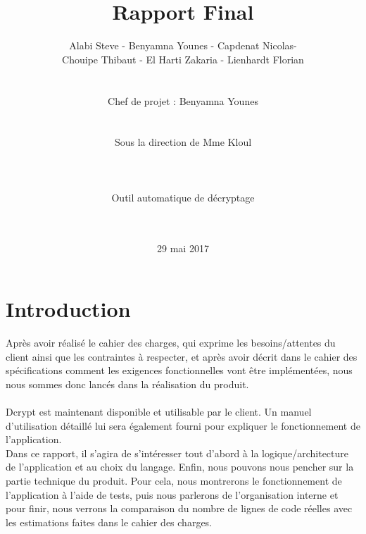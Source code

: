 \documentclass[a4]{article}
\begin{document}
	\title{\Huge{\textbf{Rapport Final}}}
	\author{Alabi Steve - Benyamna Younes - Capdenat Nicolas- \\
		Chouipe Thibaut - El Harti Zakaria - Lienhardt Florian \\ \\ \\
		Chef de projet : Benyamna Younes \\ \\ \\ 
		Sous la direction de Mme Kloul \\ \\ \\ \\
		Outil automatique de décryptage \\ \\ \\}
	\date{29 mai 2017}
		

	\begin{titlepage}
		\maketitle
		\vspace{20em}
	\end{titlepage}
	\section{Introduction}
  
Après avoir réalisé le cahier des charges, qui exprime les besoins/attentes du client ainsi que les contraintes à 
respecter, et après avoir décrit dans le cahier des spécifications comment les exigences fonctionnelles vont être 
implémentées, nous nous sommes donc lancés dans la réalisation du produit. \\ \\
Dcrypt est maintenant disponible et utilisable par le client.
Un manuel d'utilisation détaillé lui sera également fourni pour expliquer le fonctionnement de l'application.\\

Dans ce rapport, il s'agira de s'intéresser tout d'abord à la logique/architecture de l'application et au choix du
langage.
Enfin, nous pouvons nous pencher sur la partie technique du produit.
Pour cela, nous montrerons le fonctionnement de l'application à l'aide de tests, puis nous parlerons de 
l'organisation interne et pour finir, nous verrons la comparaison du nombre de lignes de code réelles avec 
les estimations faites dans le cahier des charges.
\end{document}
